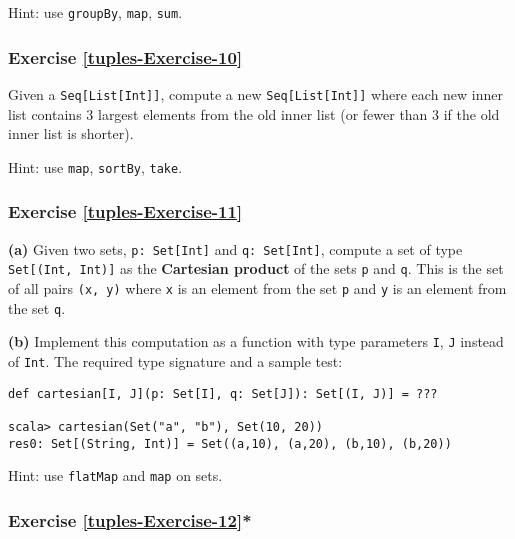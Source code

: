 Hint: use \lstinline!groupBy!, \lstinline!map!, \lstinline!sum!.

\subsubsection{Exercise \label{tuples-Exercise-10}\ref{tuples-Exercise-10}}

Given a \lstinline!Seq[List[Int]]!, compute a new \lstinline!Seq[List[Int]]!
where each new inner list contains $3$ largest elements from the
old inner list (or fewer than $3$ if the old inner list is shorter).

Hint: use \lstinline!map!, \lstinline!sortBy!, \lstinline!take!.

\subsubsection{Exercise \label{tuples-Exercise-11}\ref{tuples-Exercise-11}}

\textbf{(a)} Given two sets, \lstinline!p: Set[Int]! and \lstinline!q: Set[Int]!,
compute a set of type \lstinline!Set[(Int, Int)]! as the \textbf{Cartesian
product} of the sets \lstinline!p! and
\lstinline!q!. This is the set of all pairs \lstinline!(x, y)! where
\lstinline!x! is an element from the set \lstinline!p! and \lstinline!y!
is an element from the set \lstinline!q!. 

\textbf{(b)} Implement this computation as a function with type parameters
\lstinline!I!, \lstinline!J! instead of \lstinline!Int!. The required
type signature and a sample test:
\begin{lstlisting}
def cartesian[I, J](p: Set[I], q: Set[J]): Set[(I, J)] = ???

scala> cartesian(Set("a", "b"), Set(10, 20))
res0: Set[(String, Int)] = Set((a,10), (a,20), (b,10), (b,20))
\end{lstlisting}

Hint: use \lstinline!flatMap! and \lstinline!map! on sets.

\subsubsection{Exercise \label{tuples-Exercise-12}\ref{tuples-Exercise-12}{*}}

